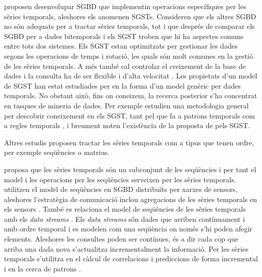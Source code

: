 \textcite{dreyer94} proposen desenvolupar \gls{SGBD} que implementin
operacions específiques per les sèries temporals, aleshores els
anomenen \glspl{SGST}. Consideren que els altres \gls{SGBD} no són
adequats per a tractar sèries temporals, tot i que després de comparar
els \gls{SGBD} per a dades bitemporals i els
\gls{SGST} \parencite{schmidt95} troben que hi ha aspectes comuns
entre tots dos sistemes.  Els \gls{SGST} estan optimitzats per
gestionar les dades segons les operacions de temps i rotació, les
quals són molt comunes en la gestió de les sèries temporals.  A més
també cal controlar el creixement de la base de dades i la consulta ha
de ser flexible i d'alta velocitat \parencite{keogh10:isax}.  Les
propietats d'un model de \gls{SGST} han estat estudiades per
\textcite{segev87:sigmod} en la forma d'un model genèric per dades
temporals.  No obstant això, fins on coneixem, la recerca posterior
s'ha concentrat en tasques de mineria de dades. Per exemple
\textcite{last01} estudien una metodologia general per descobrir
coneixement en els \gls{SGST}, tant pel que fa a patrons
temporals %
com a regles temporals%
, i breument noten l'existència de la proposta de \textcite{dreyer94}
pels \gls{SGST}.



Altres estudis proposen tractar les sèries temporals com a tipus que
tenen ordre, per exemple seqüències o matrius.

\textcite{seshadri96:thesis} proposa que les sèries temporals són un
subconjunt de les seqüències i per tant el model i les operacions per
les seqüències \parencite{seshadri95} serveixen per les sèries
temporals.  \textcite{bonnet01} utilitzen el model de seqüències en
\gls{SGBD} distribuïts per xarxes de sensors, aleshores l'estratègia
de comunicació inclou agregacions de les sèries temporals en els
sensors \parencite{demers03}.  També es relaciona el model de
seqüències de les sèries temporals amb els \emph{data
  streams} \parencite{babcock02,jagadish95,ogras06}. Els \emph{data
  streams} són dades que arriben contínuament i amb ordre temporal i
es modelen com una seqüència on només s'hi poden afegir
elements. Aleshores les consultes poden ser contínues, és a dir cada
cop que arriba una dada nova s'actualitza incrementalment la
informació. Per les sèries temporals s'utilitza en el càlcul de
correlacions i prediccions de forma incremental \parencite{yi00} i en
la cerca de patrons \parencite{bai05}.

